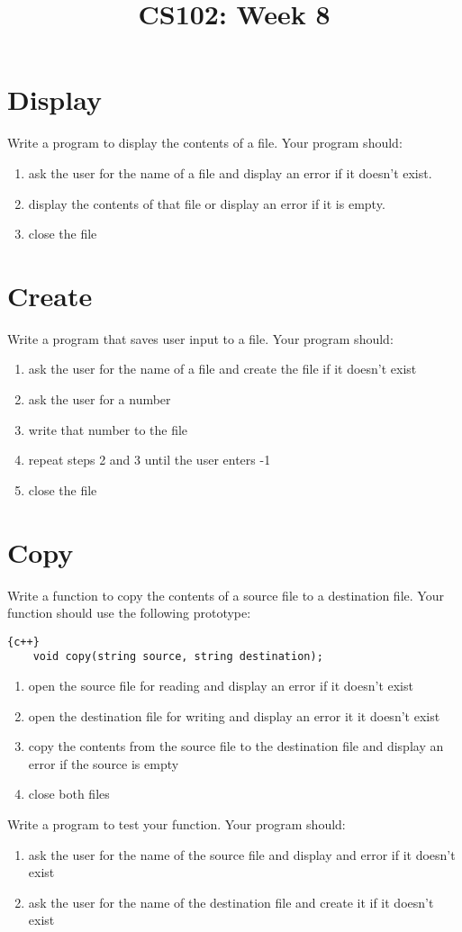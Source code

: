 \documentclass{article}
\begin{document}
\title{CS102: Week 8}

\maketitle

\section*{Display}
Write a program to display the contents of a file. Your program should:
\begin{enumerate}
	\item ask the user for the name of a file and display an error if it doesn't exist.
	\item display the contents of that file or display an error if it is empty.
	\item close the file
\end{enumerate}

\section*{Create}
Write a program that saves user input to a file. Your program should:
\begin{enumerate}
	\item ask the user for the name of a file and create the file if it doesn't exist
	\item ask the user for a number
	\item write that number to the file
	\item repeat steps 2 and 3 until the user enters -1
	\item close the file
\end{enumerate}

\section*{Copy}
Write a function to copy the contents of a source file to a destination file. Your function should use the following prototype:
\begin{lstlisting}{c++}
	void copy(string source, string destination);
\end{lstlisting}
\begin{enumerate}
	\item open the source file for reading and display an error if it doesn't exist
	\item open the destination file for writing and display an error it it doesn't exist
	\item copy the contents from the source file to the destination file and display an error if the source is empty
	\item close both files
\end{enumerate}
Write a program to test your function. Your program should:
\begin{enumerate}
	\item ask the user for the name of the source file and display and error if it doesn't exist
	\item ask the user for the name of the destination file and create it if it doesn't exist
\end{enumerate}
\pagebreak
\end{document}
